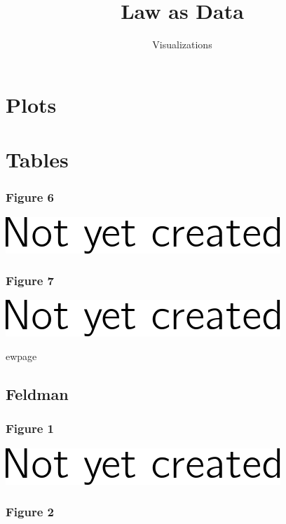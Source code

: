 \documentclass[]{article}
\title{Law as Data}
\subtitle{Visualizations}
\author{}
\date{}
\begin{document}
\maketitle

{
\setcounter{tocdepth}{2}
\tableofcontents
}
\section{Plots}\label{plots}

\section{Tables}\label{tables}

\subsubsection{Figure 6}\label{figure-6}

\includegraphics{figures/alexander6-1.png}

\subsubsection{Figure 7}\label{figure-7}

\includegraphics{figures/alexander7-1.png}

ewpage

\subsection{Feldman}\label{feldman}

\subsubsection{Figure 1}\label{figure-1}

\includegraphics{figures/feldman1-1.png}

\subsubsection{Figure 2}\label{figure-2}
\end{document}
